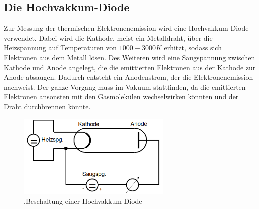 \subsection{Die Hochvakkum-Diode}
Zur Messung der thermischen Elektronenemission wird eine Hochvakkum-Diode verwendet.
Dabei wird die Kathode, meist ein Metalldraht, über die Heizspannung auf Temperaturen von $1000 - 3000 K$ erhitzt, sodass sich Elektronen aus dem Metall lösen.
Des Weiteren wird eine Saugspannung zwischen Kathode und Anode angelegt, die die emittierten Elektronen aus der Kathode zur Anode absaugen.
Dadurch entsteht ein Anodenstrom, der die Elektronenemission nachweist.
Der ganze Vorgang muss im Vakuum stattfinden, da die emittierten Elektronen ansonsten mit den Gasmolekülen wechselwirken könnten und der Draht durchbrennen könnte.
\begin{figure}[h]
    \centering
    \includegraphics[height=4cm]{Theorie/Diode.png}
    \caption{.Beschaltung einer Hochvakkum-Diode}
    \label{fig:diode}
\end{figure}

